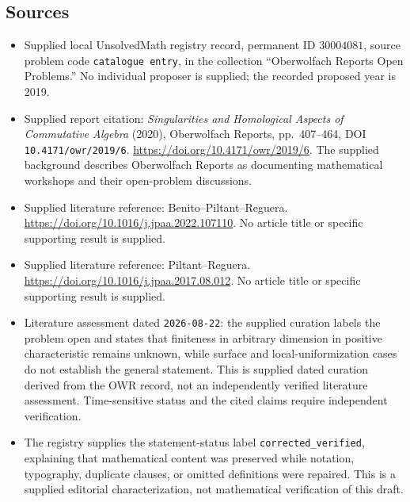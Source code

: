 \documentclass[11pt]{article}
\begin{document}
\subsection{Sources}
\begin{itemize}
\item Supplied local UnsolvedMath registry record, permanent ID \(30004081\), source problem code \texttt{catalogue entry}, in the collection ``Oberwolfach Reports Open Problems.'' No individual proposer is supplied; the recorded proposed year is 2019.
\item Supplied report citation: \emph{Singularities and Homological Aspects of Commutative Algebra} (2020), Oberwolfach Reports, pp.~407--464, DOI \texttt{10.4171/owr/2019/6}. \url{https://doi.org/10.4171/owr/2019/6}. The supplied background describes Oberwolfach Reports as documenting mathematical workshops and their open-problem discussions.
\item Supplied literature reference: Benito--Piltant--Reguera. \url{https://doi.org/10.1016/j.jpaa.2022.107110}. No article title or specific supporting result is supplied.
\item Supplied literature reference: Piltant--Reguera. \url{https://doi.org/10.1016/j.jpaa.2017.08.012}. No article title or specific supporting result is supplied.
\item Literature assessment dated \texttt{2026-08-22}: the supplied curation labels the problem open and states that finiteness in arbitrary dimension in positive characteristic remains unknown, while surface and local-uniformization cases do not establish the general statement. This is supplied dated curation derived from the OWR record, not an independently verified literature assessment. Time-sensitive status and the cited claims require independent verification.
\item The registry supplies the statement-status label \texttt{corrected\_verified}, explaining that mathematical content was preserved while notation, typography, duplicate clauses, or omitted definitions were repaired. This is a supplied editorial characterization, not mathematical verification of this draft.
\end{itemize}
\end{document}
